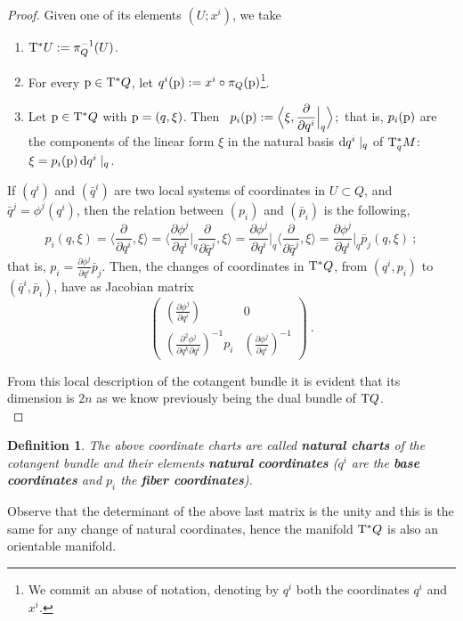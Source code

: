 \documentclass[12pt]{report}
\newtheorem{definition}[teor]{Definition}
\def\dst{\displaystyle}
\def\derpar#1#2{\frac{\partial{#1}}{\partial{#2}}}
\def\qed{\ifvmode\removelastskip\fi
{\unskip\nobreak\hfil\penalty50\hbox{}\nobreak\hfil
\hbox{\vrule height1.2ex width1.2ex}\parfillskip=0pt
\finalhyphendemerits=0 \par\smallskip}}
\def\d{{\rm d}}
\def\Tan{{\rm T}}
\begin{document}
\begin{appendix}
\begin{proof}
Given one of its elements $(U;x^i)$, we take 
\begin{enumerate}
\item
$\Tan^* U := \pi_Q^{-1}(U)$.
\item
For every ${\rm p} \in \Tan^*Q$, let $q^i({\rm p}) := x^i \circ \pi_Q ({\rm p})$\footnote
{We commit an abuse of notation, denoting
by $q^i$ both the coordinates $q^i$ and $x^i$.}.
\item
Let ${\rm p} \in \Tan^*Q$ with ${\rm p}=(q,\xi)$. Then \
$\displaystyle p_i({\rm p}) := \Big\langle\xi ,\derpar{}{q^i}\Big\vert_q\Big\rangle$;\
that is, $p_i({\rm p})$ are the components of the linear form
$\xi$ in the natural basis $\d q^i\mid_q$ of $\Tan^*_qM$: 
$\xi = p_i({\rm p})\,\d q^i\mid_q$.
\end{enumerate}
If $(q^i)$ and $(\bar q^i)$ are two local systems of coordinates
in $U\subset Q$, and $\bar q^j =\phi^j (q^i)$, then
the relation between $(p_i)$ and $(\bar p_i)$ is the following,
$$
p_i(q,\xi )=\Big\langle\derpar{}{q^i},\xi\Big\rangle=
\Big\langle\derpar{\phi^j}{q^i}\Big\vert_q \derpar{}{\bar q^j},\xi\Big\rangle
=\derpar{\phi^j}{q^i}\Big\vert_q\Big\langle\derpar{}{\bar q^j},\xi\Big\rangle
=\derpar{\phi^j}{q^i}\Big\vert_q \bar p_j(q,\xi ) \ ;
$$
that is, \(\dst p_i=\derpar{\phi^j}{q^i}\bar p_j\).
Then, the changes of coordinates in $\Tan^*Q$,
from $(q^i,p_i)$ to $(\bar q^i,\bar p_i)$, have as Jacobian matrix
$$
\left(\begin{matrix}\displaystyle\left(\derpar{\phi^j}{q^i}\right) & 0 \\
\displaystyle\left(\frac{\partial^2\phi^j}{\partial q^k\partial q^i}\right)^{-1}p_i &
\displaystyle\left(\derpar{\phi^j}{q^i}\right)^{-1}\end{matrix}\right) \ .
$$

From this local description of the cotangent bundle
it is evident that its dimension is $2n$ as we know previously being the dual bundle of $\Tan Q$.
\\ \qed  \end{proof}

\begin{definition}
The above coordinate charts are called
\textbf{natural charts} of the cotangent bundle
and their elements \textbf{natural coordinates}
($q^i$ are the \textbf{ base coordinates}
and $p_i$ the \textbf{fiber coordinates}).
\end{definition}

Observe that the determinant of the above last matrix is the unity and this is the same for any change of natural coordinates, hence the manifold $\Tan^*Q$ is also an orientable manifold.


\end{appendix}
\end{document}
